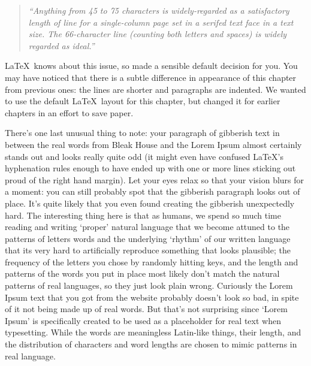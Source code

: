 \begin{refsection}
\begin{quote}
\emph{
``Anything from 45 to 75 characters is widely-regarded as a satisfactory length of line for a single-column page set in a serifed text face in a text size. The 66-character line (counting both letters and spaces) is widely regarded as ideal.''}
\end{quote}

\LaTeX\ knows about this issue, so made a sensible default decision for you. You may have noticed that there is a subtle difference in appearance of this chapter from previous ones: the lines are shorter and paragraphs are indented. We wanted to use the default \LaTeX\ layout for this chapter, but changed it for earlier chapters in an effort to save paper.

There's one last unusual thing to note: your paragraph of gibberish text in between the real words from Bleak House and the Lorem Ipsum almost certainly stands out and looks really quite odd (it might even have confused \LaTeX's hyphenation rules enough to have ended up with one or more lines sticking out proud of the right hand margin).  Let your eyes relax so that your vision blurs for a moment: you can still probably spot that the gibberish paragraph looks out of place. It's quite likely that you even found creating the gibberish unexpectedly hard. The interesting thing here is that as humans, we spend so much time reading and writing `proper' natural language that we become attuned to the patterns of letters words and the underlying `rhythm' of our written language that its very hard to artificially reproduce something that looks plausible; the frequency of the letters you chose by randomly hitting keys, and the length and patterns of the words you put in place most likely don't match the natural patterns of real languages, so they just look plain wrong.  Curiously the Lorem Ipsum text that you got from the website probably doesn't look so bad, in spite of it not being made up of real words. But that's not surprising since `Lorem Ipsum' is specifically created to be used as a placeholder for real text when typesetting. While the words are meaningless Latin-like things, their length, and the distribution of characters and word lengths are chosen to mimic patterns in real language.

\label{sec:exercise-3}


\end{refsection}
